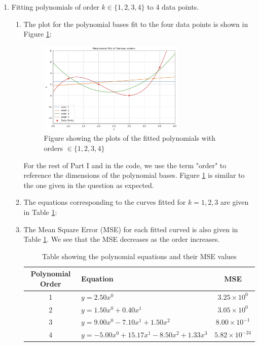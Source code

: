 \documentclass[final,3p,times,12pt]{article}
\begin{document}
\begin{enumerate} %
    \item Fitting polynomials of order $k \in \{1, 2, 3, 4\}$ to 4 data points. %
    \begin{enumerate} 
        \item The plot for the polynomial bases fit to the four data points is shown in Figure \ref{fig:question_1a}:

        \begin{figure}[H]
            \centering
            \includegraphics[width=0.7\textwidth]{images/question_1a.png}
            \caption{Figure showing the plots of the fitted polynomials with orders $\in \{1, 2, 3, 4\}$}
            \label{fig:question_1a}
        \end{figure}

        For the rest of Part I and in the code, we use the term "order" to reference the dimensions of the polynomial bases. Figure \ref{fig:question_1a} is similar to the one given in the question as expected. 

        \item  The equations corresponding to the curves fitted for $k = 1, 2, 3$ are given in Table \ref{tab:polynomial_mse}:


        \item The Mean Square Error (MSE) for each fitted curved is also given in Table \ref{tab:polynomial_mse}. We see that the MSE decreases as the order increases. 

        \begin{table}[H]
        \centering
        \begin{tabular}{|c|l|c|}
        \hline
        \textbf{Polynomial Order} & \textbf{Equation} & \textbf{MSE} \\ \hline
        1 & \(y = 2.50x^0\) & \(3.25 \times 10^0\) \\ \hline
        2 & \(y = 1.50x^0 + 0.40x^1\) & \(3.05 \times 10^0\) \\ \hline
        3 & \(y = 9.00x^0 - 7.10x^1 + 1.50x^2\) & \(8.00 \times 10^{-1}\) \\ \hline
        4 & \(y = -5.00x^0 + 15.17x^1 - 8.50x^2 + 1.33x^3\) & \(5.82 \times 10^{-24}\) \\ \hline
        \end{tabular}
        \caption{Table showing the polynomial equations and their MSE values}
        \label{tab:polynomial_mse}
        \end{table}
    \end{enumerate}
    

\end{enumerate}
\end{document}
